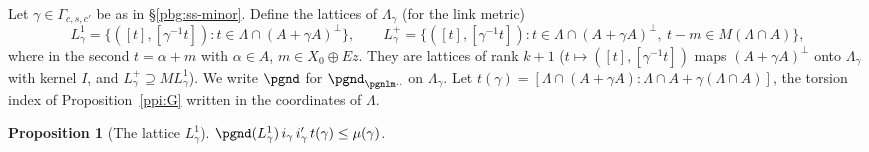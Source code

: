 \documentclass[10pt]{amsart}
\newtheorem{proposition}[theorem]{Proposition}
\theoremstyle{definition}
\theoremstyle{remark}
\begin{document}
Let $\gamma\in\Gamma_{c,s,c'}$ be as in \S\ref{pbg:ss-minor}. Define the lattices of $\Lambda_\gamma$
(for the link metric)
\[
L^1_\gamma=\{([t],[\gamma^{-1}t]):t\in\Lambda\cap(A+\gamma A)^\perp\},\qquad
L^+_\gamma=\{([t],[\gamma^{-1}t]):t\in\Lambda\cap(A+\gamma A)^\perp,\ t-m\in M(\Lambda\cap A)\},
\]
where in the second $t=\alpha+m$ with $\alpha\in A$, $m\in X_0\oplus Ez$. They are lattices of rank $k+1$
($t\mapsto([t],[\gamma^{-1}t])$ maps $(A+\gamma A)^\perp$ onto $\Lambda_\gamma$ with kernel $I$, and
$L^+_\gamma\supseteq ML^1_\gamma$). We write $\pgnd$ for $\pgnd_{\pgnlm\cdot\cdot}$ on $\Lambda_\gamma$.
Let $t(\gamma)=[\Lambda\cap(A+\gamma A):\Lambda\cap A+\gamma(\Lambda\cap A)]$, the torsion index of
Proposition~\ref{ppi:G} written in the coordinates of $\Lambda$.

\begin{proposition}[The lattice $L^1_\gamma$]\label{pbg:L1}
$\pgnd(L^1_\gamma)\,i_\gamma\,i'_\gamma\,t(\gamma)\le\mu(\gamma)$.
\end{proposition}
\end{document}
